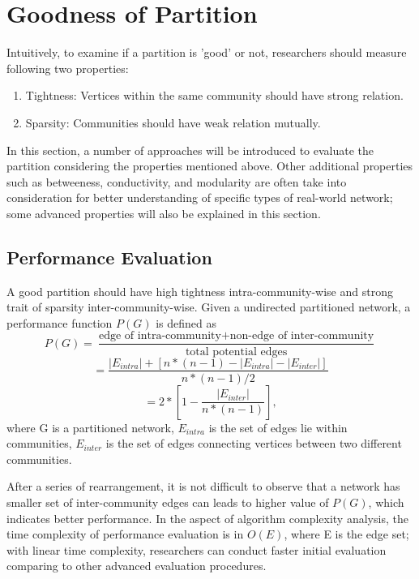 \documentclass[12pt]{article}
\begin{document}
\pagebreak

\section{Goodness of Partition}

Intuitively, to examine if a partition is 'good' or not, researchers should measure following two properties: 
\begin{enumerate}[label=(\alph*)]
\item Tightness: Vertices within the same community should have strong relation.
\item Sparsity: Communities should have weak relation mutually.
\end{enumerate}

In this section, a number of approaches will be introduced to evaluate the partition considering the properties mentioned above. Other additional properties such as betweeness, conductivity, and modularity are often take into consideration for better understanding of specific types of real-world network\cite{7,8}; some advanced properties will also be explained in this section.

\subsection{Performance Evaluation}
A good partition should have high tightness intra-community-wise and strong trait of sparsity inter-community-wise. Given a undirected partitioned network, a performance function $P(G)$ is defined as
$$P(G) = \frac{\text{edge of intra-community} + \text{non-edge of inter-community}}{\text{total potential edges}}
$$
$$
=\frac{|E_{intra}| + [n*(n-1) - |E_{intra}| - |E_{inter}|]}{n*(n-1)/2}
$$
\begin{equation}\label{eq:perf_eva3}
=2*\left[ 1 - \frac{ |E_{inter}| } { n*\left( n-1 \right) }  \right],
\end{equation}
where G is a partitioned network, $E_{intra}$ is the set of edges lie within communities, $E_{inter}$ is the set of edges connecting vertices between two different communities. 

\bigbreak

After a series of rearrangement, it is not difficult to observe that a network has smaller set of inter-community edges can leads to higher value of $P(G)$, which indicates better performance\cite{7}. In the aspect of algorithm complexity analysis, the time complexity of performance evaluation is in $O(E)$, where E is the edge set; with linear time complexity, researchers can conduct faster initial evaluation comparing to other advanced evaluation procedures. 
\end{document}
